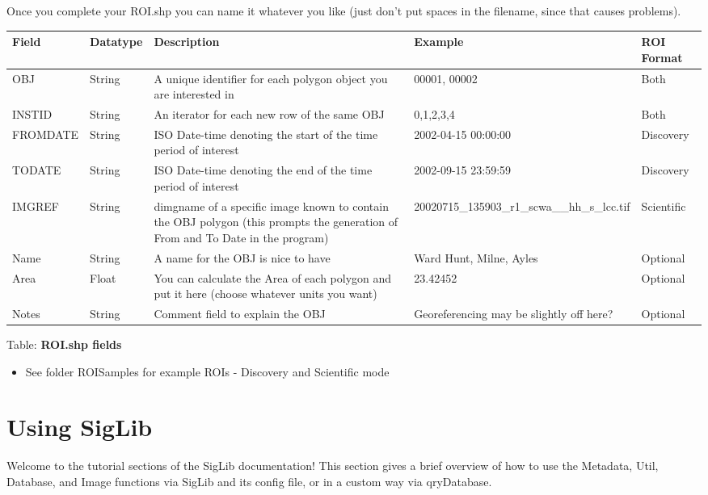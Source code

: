 \documentclass[letterpaper,10pt,openany,oneside]{sphinxmanual}
\begin{document}
Once you complete your ROI.shp you can name it whatever you like (just
don't put spaces in the filename, since that causes problems).

\begin{tabulary}{\linewidth}{|L|L|L|L|L|}
\hline
\textsf{\relax 
Field
} & \textsf{\relax 
Datatype
} & \textsf{\relax 
Description
} & \textsf{\relax 
Example
} & \textsf{\relax 
ROI Format
}\\
\hline
\textbar{} OBJ
 & 
String
 & 
A unique identifier for each polygon object you are interested in
 & 
00001, 00002
 & 
Both
\\
\hline
\textbar{} INSTID
 & 
String
 & 
An iterator for each new row of the same OBJ
 & 
0,1,2,3,4
 & 
Both
\\
\hline
\textbar{} FROMDATE
 & 
String
 & 
ISO Date-time denoting the start of the time period of interest
 & 
2002-04-15 00:00:00
 & 
Discovery
\\
\hline
\textbar{} TODATE
 & 
String
 & 
ISO Date-time denoting the end of the time period of interest
 & 
2002-09-15 23:59:59
 & 
Discovery
\\
\hline
\textbar{} IMGREF
 & 
String
 & 
dimgname of a specific image known to contain the OBJ polygon (this prompts the generation of From and To Date in the program)
 & 
20020715\_135903\_r1\_scwa\_\_hh\_s\_lcc.tif
 & 
Scientific
\\
\hline
\textbar{} Name
 & 
String
 & 
A name for the OBJ is nice to have
 & 
Ward Hunt, Milne, Ayles
 & 
Optional
\\
\hline
\textbar{} Area
 & 
Float
 & 
You can calculate the Area of each polygon and put it here (choose whatever units you want)
 & 
23.42452
 & 
Optional
\\
\hline
\textbar{} Notes
 & 
String
 & 
Comment field to explain the OBJ
 & 
Georeferencing may be slightly off here?
 & 
Optional
\\
\hline\end{tabulary}


Table: \textbf{ROI.shp fields}
\begin{itemize}
\item {} 
See folder ROISamples for example ROIs - Discovery and Scientific
mode

\end{itemize}


\chapter{Using SigLib}
\label{tutorial::doc}\label{tutorial:using-siglib}
Welcome to the tutorial sections of the SigLib documentation! This section
gives a brief overview of how to use the Metadata,
Util, Database, and Image functions via SigLib and its config file,
or in a custom way via qryDatabase.
\end{document}
